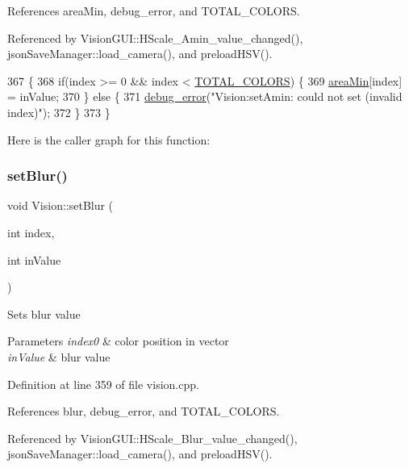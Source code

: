References area\+Min, debug\+\_\+error, and T\+O\+T\+A\+L\+\_\+\+C\+O\+L\+O\+RS.



Referenced by Vision\+G\+U\+I\+::\+H\+Scale\+\_\+\+Amin\+\_\+value\+\_\+changed(), json\+Save\+Manager\+::load\+\_\+camera(), and preload\+H\+S\+V().


\begin{DoxyCode}
367                                            \{
368     \textcolor{keywordflow}{if}(index >= 0 && index < \hyperlink{class_vision_a9fbea649a805b17ad9ea18f3f06c14f2}{TOTAL\_COLORS}) \{
369         \hyperlink{class_vision_a674b5bf7f6570f5b8e053ee28a9721ff}{areaMin}[index] = inValue;
370     \} \textcolor{keywordflow}{else} \{
371         \hyperlink{debug_8hpp_ab163a9e3f1ed9f61bd7d743fdf4a161a}{debug\_error}(\textcolor{stringliteral}{"Vision:setAmin: could not set (invalid index)"});
372     \}
373 \}
\end{DoxyCode}
Here is the caller graph for this function\+:
\mbox{\label{class_vision_aa40b48aebdf61dfda490fbc2620d2ac3}} 
\subsubsection{\texorpdfstring{set\+Blur()}{setBlur()}}
{\footnotesize\ttfamily void Vision\+::set\+Blur (\begin{DoxyParamCaption}\item[{int}]{index,  }\item[{int}]{in\+Value }\end{DoxyParamCaption})}

Sets blur value 
\begin{DoxyParams}{Parameters}
{\em index0} & color position in vector \\
\hline
{\em in\+Value} & blur value \\
\hline
\end{DoxyParams}


Definition at line 359 of file vision.\+cpp.



References blur, debug\+\_\+error, and T\+O\+T\+A\+L\+\_\+\+C\+O\+L\+O\+RS.



Referenced by Vision\+G\+U\+I\+::\+H\+Scale\+\_\+\+Blur\+\_\+value\+\_\+changed(), json\+Save\+Manager\+::load\+\_\+camera(), and preload\+H\+S\+V().


